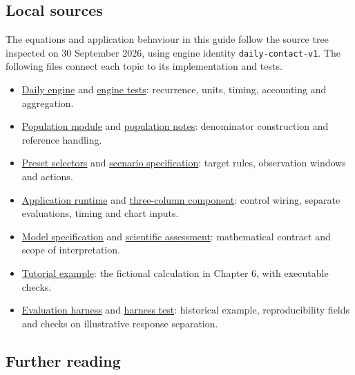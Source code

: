 \documentclass[11pt,a4paper]{article}
\providecommand{\tightlist}{\setlength{\itemsep}{0.3em}\setlength{\parskip}{0pt}}
\begin{document}
\subsection{Local sources}\label{local-sources}

The equations and application behaviour in this guide follow the source
tree inspected on 30 September 2026, using engine identity
\texttt{daily-contact-v1}. The following files connect each topic to its
implementation and tests.

\begin{itemize}
\tightlist
\item
  \href{../../src/runtime/simulation-engine.js}{Daily engine} and
  \href{../../tests/simulation-engine.test.js}{engine tests}: recurrence,
  units, timing, accounting and aggregation.
\item
  \href{../../src/runtime/simulation-population.js}{Population module} and
  \href{../../docs/simulation-population.md}{population notes}: denominator
  construction and reference handling.
\item
  \href{../../src/runtime/intervention-presets.js}{Preset selectors} and
  \href{../../docs/network-scenarios.md}{scenario specification}: target rules,
  observation windows and actions.
\item
  \href{../../src/runtime/herdlink-runtime.js}{Application runtime} and
  \href{../../src/components/ScenarioComparison.jsx}{three-column
  component}: control wiring, separate evaluations, timing and chart
  inputs.
\item
  \href{../../docs/simulation-model.md}{Model specification} and
  \href{../../docs/simulation-scientific-assessment.md}{scientific assessment}:
  mathematical contract and scope of interpretation.
\item
  \href{../../scripts/simulation-tutorial-example.mjs}{Tutorial example}:
  the fictional calculation in Chapter 6, with executable checks.
\item
  \href{../../scripts/evaluate-scenario-presets.js}{Evaluation harness} and
  \href{../../tests/evaluation-harness.test.js}{harness test}: historical
  example, reproducibility fields and checks on illustrative response
  separation.
\end{itemize}

\subsection{Further reading}\label{further-reading}
\end{document}
